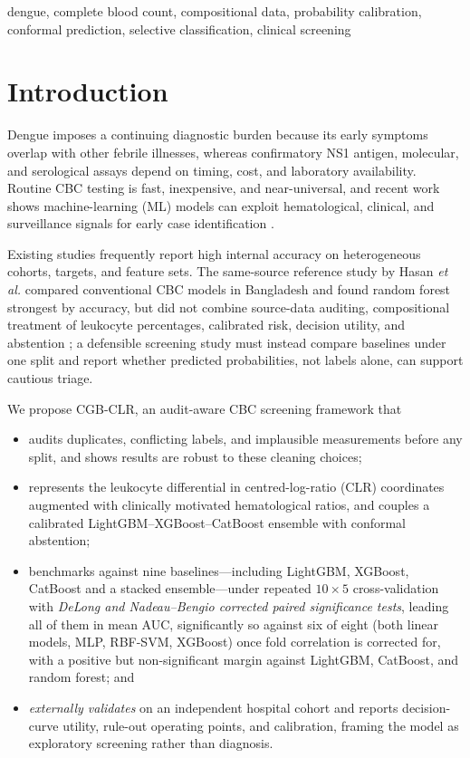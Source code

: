 \documentclass[conference]{IEEEtran}
\begin{document}
\begin{IEEEkeywords}
dengue, complete blood count, compositional data, probability calibration,
conformal prediction, selective classification, clinical screening
\end{IEEEkeywords}

\section{Introduction}

Dengue imposes a continuing diagnostic burden because its early symptoms
overlap with other febrile illnesses, whereas confirmatory NS1 antigen,
molecular, and serological assays depend on timing, cost, and laboratory
availability. Routine CBC testing is fast, inexpensive, and near-universal,
and recent work shows machine-learning (ML) models can exploit hematological,
clinical, and surveillance signals for early case identification
\cite{hasan2026,deepika2025,andrade2025}.

Existing studies frequently report high internal accuracy on heterogeneous
cohorts, targets, and feature sets. The same-source reference study by Hasan
\emph{et al.} compared conventional CBC models in Bangladesh and found random
forest strongest by accuracy, but did not combine source-data auditing,
compositional treatment of leukocyte percentages, calibrated risk, decision
utility, and abstention \cite{hasan2026}; a defensible screening study must
instead compare baselines under one split and report whether predicted
probabilities, not labels alone, can support cautious triage.

We propose CGB-CLR, an audit-aware CBC screening framework that
\begin{itemize}\itemsep1pt
\item audits duplicates, conflicting labels, and implausible measurements before
any split, and shows results are robust to these cleaning choices;
\item represents the leukocyte differential in centred-log-ratio (CLR)
coordinates augmented with clinically motivated hematological ratios, and couples
a calibrated LightGBM--XGBoost--CatBoost ensemble with conformal abstention;
\item benchmarks against nine baselines---including LightGBM, XGBoost, CatBoost
and a stacked ensemble---under repeated $10\times5$ cross-validation with
\emph{DeLong and Nadeau--Bengio corrected paired significance tests}, leading
all of them in mean AUC, significantly so against six of eight (both linear
models, MLP, RBF-SVM, XGBoost) once fold correlation is corrected for, with a
positive but non-significant margin against LightGBM, CatBoost, and random
forest; and
\item \emph{externally validates} on an independent hospital cohort and reports
decision-curve utility, rule-out operating points, and calibration, framing the
model as exploratory screening rather than diagnosis.
\end{itemize}
\end{document}
